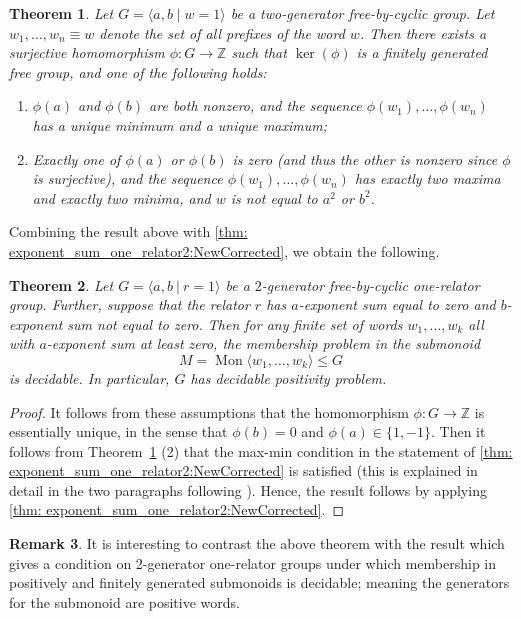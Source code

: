 \documentclass[11pt]{amsart}
\newcommand{\Mgen}[1]{\operatorname{Mon}\bigl\langle #1 \bigr\rangle}
\newcommand{\Gpres}[2]{\bigl\langle #1\:|\:#2 \bigr\rangle}
\theoremstyle{plain}
\newtheorem{theorem}{Theorem}[section]
\theoremstyle{definition}
\newtheorem{remark}[theorem]{Remark}
\begin{document}
\begin{theorem} \cite[Theorem 4.3]{Brown1987} \label{thm:Brown}
Let 
$
G = \langle a, b \mid w = 1 \rangle
$
be a two-generator free-by-cyclic group. Let $w_1, \ldots, w_n \equiv w$ denote the set of all prefixes of the word $w$.
 Then there exists a surjective homomorphism $\phi: G \to \mathbb{Z}$ such that $\ker(\phi)$ is a finitely generated free group, and one of the following holds:
\begin{enumerate}
    \item $\phi(a)$ and $\phi(b)$ are both nonzero, and the sequence $\phi(w_1), \ldots, \phi(w_n)$ has a unique minimum and a unique maximum;
    \item Exactly one of $\phi(a)$ or $\phi(b)$ is zero (and thus the other is nonzero since $\phi$ is surjective), and the sequence $\phi(w_1), \ldots, \phi(w_n)$ has exactly two maxima and exactly two minima, and $w$ is not equal to $a^2$ or $b^2$.
\end{enumerate}
\end{theorem}

Combining the result above with \cref{thm: exponent_sum_one_relator2:NewCorrected}, we obtain the following.


\begin{theorem}\label{thm:free:by:cyclic}
Let $G = \Gpres{a,b}{r = 1}$ be a $2$-generator free-by-cyclic one-relator group. Further, suppose that the relator $r$ has $a$-exponent sum equal to zero and $b$-exponent sum not equal to zero.
Then for any finite set of words $w_1, \ldots, w_k$ all with $a$-exponent sum at least zero, the membership problem in the submonoid 
\[
M = \Mgen{w_1, \ldots, w_k} \leqslant G
\]
is decidable.
In particular, $G$ has decidable positivity problem.
\end{theorem}
\begin{proof}
It follows from these assumptions that the homomorphism $\phi: G \to \mathbb{Z}$ is essentially unique,
in the sense that $\phi(b)=0$ and $\phi(a) \in \{1,-1\}$. Then it follows from 
Theorem~\ref{thm:Brown} (2) that the max-min condition in the statement of \cref{thm: exponent_sum_one_relator2:NewCorrected} is satisfied (this is explained in detail in the two paragraphs following \cite[Theorem~5.1]{dunfield2006random}). 
Hence, the result follows by applying \cref{thm: exponent_sum_one_relator2:NewCorrected}. 
\end{proof}


\begin{remark}
It is interesting to contrast the above theorem with the result  
\cite[Theorem 2.4]{margolis2005distortion}
which gives a condition on 2-generator one-relator groups under which membership in  positively and finitely generated submonoids is decidable; meaning the generators for the submonoid are positive words. 
\end{remark}
\end{document}
